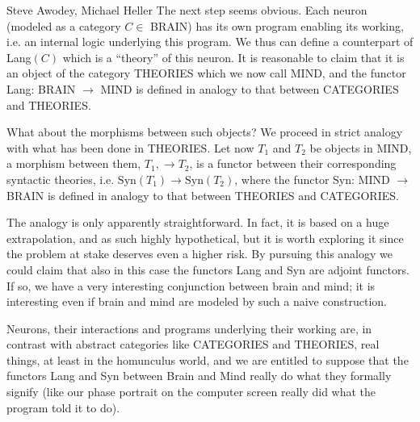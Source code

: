 \begin{artengenv2auth}{Steve Awodey, Michael Heller}
The next step seems obvious. Each neuron (modeled as a category $C \in $ BRAIN) has its own program enabling its working, i.e. an internal logic underlying this program. We thus can define a counterpart of Lang$(C)$ which is a ``theory'' of this neuron. It is reasonable to claim that it is an object of the category THEORIES which we now call MIND, and the functor Lang: BRAIN $\to $ MIND is defined in analogy to that between CATEGORIES and THEORIES.

What about the morphisms between such objects? We proceed in strict analogy with what has been done in THEORIES. Let now $T_1$ and $T_2$ be objects in MIND, a morphism between them, $T_1, \to T_2$, is a functor between their corresponding syntactic theories, i.e. $\mathrm{Syn}(T_1) \to \mathrm{Syn}(T_2)$, where the functor Syn: MIND $\to $ BRAIN is defined in analogy to that between THEORIES and CATEGORIES.

The analogy is only apparently straightforward. In fact, it is based on a huge extrapolation, and as such highly hypothetical, but it is worth exploring it since the problem at stake deserves even a higher risk. By pursuing this analogy we could claim that also in this case the functors Lang and Syn are adjoint functors. If so, we have a very interesting conjunction between brain and mind; it is interesting even if brain and mind are modeled by such a naive construction. 

Neurons, their interactions and programs underlying their working  are, in contrast with abstract categories like CATEGORIES and THEORIES, real things, at least in the homunculus world, and we are entitled to suppose that the functors Lang and Syn between Brain and Mind really do what they formally signify (like our phase portrait on the computer screen really did what the program told it to do). 


\end{artengenv2auth}
